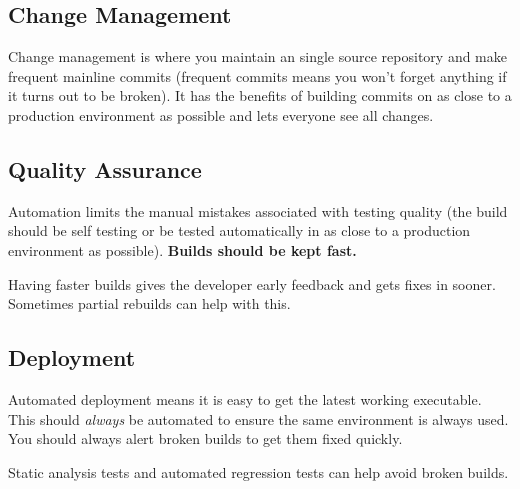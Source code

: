 \subsection{Change Management}\label{sub:change_management}

Change management is where you maintain an single source repository and make frequent mainline commits (frequent commits means you won't forget anything if it turns out to be broken).
It has the benefits of building commits on as close to a production environment as possible and lets everyone see all changes.

\subsection{Quality Assurance}\label{sub:quality_assurance}

Automation limits the manual mistakes associated with testing quality (the build should be self testing or be tested automatically in as close to a production environment as possible).
\textbf{Builds should be kept fast.}

Having faster builds gives the developer early feedback and gets fixes in sooner.
Sometimes partial rebuilds can help with this.

\subsection{Deployment}\label{sub:deployment}

Automated deployment means it is easy to get the latest working executable.
This should \emph{always} be automated to ensure the same environment is always used.
You should always alert broken builds to get them fixed quickly.

Static analysis tests and automated regression tests can help avoid broken builds.
